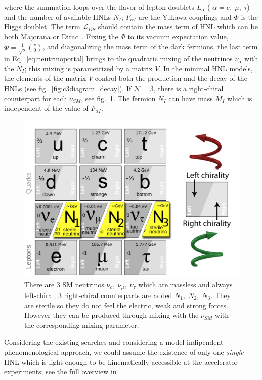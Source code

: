 where the summation loops over the flavor of lepton doublets ${L}_{\alpha}$ ( $\alpha = e,\; \mu, \: \tau$) and the number of available HNLs $N_{I}$; $F_{\alpha I} $ are the Yukawa couplings and $\Phi$ is the Higgs doublet. The term $\mathcal{L}_{DS}$ should contain the mass term of HNL which can be both Majorana or Dirac~\cite{Alekhin_2016}.
Fixing the $\Phi$ to its vacuum expectation value, $\widetilde \Phi = \frac{1}{\sqrt{2}} \binom{v}{0}$, and diagonalizing the mass term of the dark fermions, the last term in Eq.~\ref{eq:neutrinoportal} brings to the quadratic mixing of the neutrinos $\nu_{\alpha}$ with the $N_{I}$; this mixing is parametrized by a matrix $V.$ In the minimal HNL models, the elements of the matrix $V$ control both the production and the decay of the HNLs (see fig.~\ref{fig:c3diagram_decay}). 
If $\mathcal{N} = 3$, there is a right-chiral counterpart for each $\nu_{SM}$, see fig.~\ref{fig:c3sm_extension}. The fermion $N_I$ can have mass $M_I$ which is independent  of the value of $F_{\alpha I}$.
\begin{figure}[t!]
  \centering
  \includegraphics[width=.60\textwidth]{Figures/c3/SM_extension}
    \caption{There are 3 SM neutrinos $\nu_{e}, \; \nu_{\mu}, \;\nu_{\tau}$ which are massless and always left-chiral; 3 right-chiral counterparts are added $N_{1}, \; N_{2}, \;N_{3}$. They are sterile so they do not feel the electric, weak and strong forces. However they can be produced through mixing with the $\nu_{SM}$ with the corresponding mixing parameter.}
  \label{fig:c3sm_extension}
\end{figure}

Considering the existing searches and considering a model-indipendent phenomenological approach, we could assume the existence of only one \emph{single} HNL which is light enough to be kinematically accessible at the accelerator experiments; see the full overview in~\cite{Atre_2009}. 

